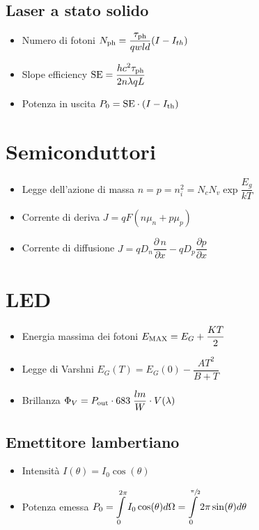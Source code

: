 \documentclass[9pt]{extarticle}
\begin{document}
\subsection{Laser a stato solido}
\begin{itemize}
  \item Numero di fotoni \( N_{\textnormal{ph}} = \dfrac{\tau_{\textnormal{ph}}}{q w l d} ( I - I_{th}) \)
  \item Slope efficiency \( \textnormal{SE} = \dfrac{h c^2 \tau_{\textnormal{ph}}}{2 n  \lambda q L} \)
  \item Potenza in uscita \( P_0 = \textnormal{SE} \cdot (I - I_{\textnormal{th}} ) \)
\end{itemize}

\newpage

\section{Semiconduttori}
\begin{itemize}
  \item Legge dell'azione di massa \( n = p = n_i ^ 2 = N_c N_v \exp{\dfrac{E_g}{k T}} \)
  \item Corrente di deriva \( J = q F (n \mu_n + p \mu_p) \)
  \item Corrente di diffusione \( J = q D_n \dfrac{\partial \, n}{\partial x} - q D_p \dfrac{\partial p}{\partial x} \)
\end{itemize}

\section{LED}
\begin{itemize}
  \item Energia massima dei fotoni \( E_{\textnormal{MAX}} = E_G + \dfrac{KT}{2} \)
  \item Legge di Varshni \( E_G (T) = E_G (0) - \dfrac{A T ^2}{B+T} \)
  \item Brillanza \( \Phi_V = P_{\textnormal{out}} \cdot 683 \; \dfrac{lm}{W} \cdot V (\lambda) \)
\end{itemize}

\subsection{Emettitore lambertiano}
\begin{itemize}
  \item Intensità \( I (\theta) = I_0 \cos(\theta) \)
  \item Potenza emessa \( \displaystyle P_0 = \int\limits_{0}^{2 \pi} I_0 \cos(\theta) d\Omega = \int\limits_{0}^{\sfrac{\pi}{2}} 2 \pi \sin(\theta) d\theta \)
\end{itemize}
\end{document}
